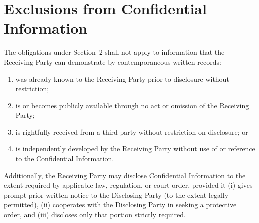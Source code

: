 \section{Exclusions from Confidential Information}

\noindent
The obligations under Section~2 shall not apply to information that the
Receiving Party can demonstrate by contemporaneous written records:

\begin{enumerate}
  \item was already known to the Receiving Party prior to disclosure without
        restriction;
  \item is or becomes publicly available through no act or omission of the
        Receiving Party;
  \item is rightfully received from a third party without restriction on
        disclosure; or
  \item is independently developed by the Receiving Party without use of
        or reference to the Confidential Information.
\end{enumerate}

\noindent
Additionally, the Receiving Party may disclose Confidential Information to the
extent required by applicable law, regulation, or court order, provided it
(i) gives prompt prior written notice to the Disclosing Party (to the extent
legally permitted), (ii) cooperates with the Disclosing Party in seeking a
protective order, and (iii) discloses only that portion strictly required.
